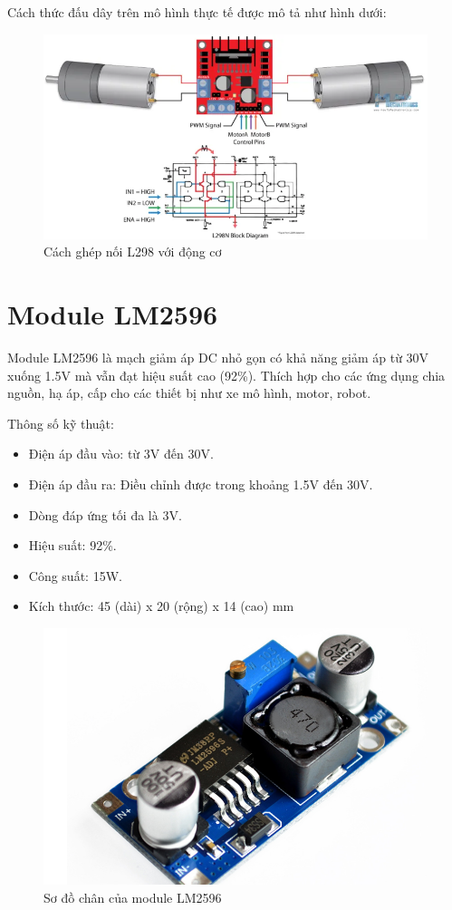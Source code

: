 \documentclass[../DoAn.tex]{subfiles}
\begin{document}
Cách thức đấu dây trên mô hình thực tế được mô tả như hình dưới:

\begin{figure}[H]
    \includegraphics[scale = 0.6]{Hinhve/L298N-Block-Diagram.png}
    \centering
    \caption{Cách ghép nối L298 với động cơ}
\end{figure}

\section{Module LM2596}
\label{section:3.5}

Module LM2596 là mạch giảm áp DC nhỏ gọn có khả năng giảm áp từ 30V xuống 1.5V mà vẫn đạt hiệu suất cao (92\%). Thích hợp cho các ứng dụng chia nguồn, hạ áp, cấp cho các thiết bị như xe mô hình, motor, robot.

Thông số kỹ thuật:
\begin{itemize}
    \item Điện áp đầu vào: từ 3V đến 30V.
    \item Điện áp đầu ra: Điều chỉnh được trong khoảng 1.5V đến 30V.
    \item Dòng đáp ứng tối đa là 3V.
    \item Hiệu suất: 92\%.
    \item Công suất: 15W.
    \item Kích thước: 45 (dài) x 20 (rộng) x 14 (cao) mm
\end{itemize}

\begin{figure}[H]
    \includegraphics[scale = 0.6]{Hinhve/LM2596.png}
    \centering
    \caption{Sơ đồ chân của module LM2596}
\end{figure}
\end{document}
